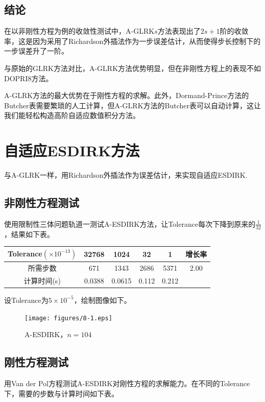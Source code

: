 \documentclass[lang=cn,10pt,bibend=bibtex]{elegantbook}
\begin{document}
\subsection{结论}

在以非刚性方程为例的收敛性测试中，A-GLRK$s$方法表现出了$2s+1$阶的收敛率，这是因为采用了Richardson外插法作为一步误差估计，从而使得步长控制下的一步误差升了一阶。

与原始的GLRK方法对比，A-GLRK方法优势明显，但在非刚性方程上的表现不如DOPRI8方法。

A-GLRK方法的最大优势在于刚性方程的求解。此外，Dormand-Prince方法的Butcher表需要繁琐的人工计算，但A-GLRK方法的Butcher表可以自动计算，这让我们能轻松构造高阶自适应数值积分方法。

\section{自适应ESDIRK方法}

与A-GLRK一样，用Richardson外插法作为误差估计，来实现自适应ESDIRK.

\subsection{非刚性方程测试}

使用限制性三体问题轨道一测试A-ESDIRK方法，让Tolerance每次下降到原来的$\frac{1}{32}$，结果如下表。

\begin{table}[H]
  \centering
  \begin{tabular}{c|cccc|c}
    Tolerance$(\times 10^{-13})$ & 32768 & 1024 & 32 & 1 & 增长率 \\ \hline
    所需步数 & 671 & 1343  & 2686 & 5371 & 2.00   \\
    计算时间(s) & 0.0388 & 0.0615  & 0.112  & 0.212 & 
  \end{tabular}
\end{table}

设Tolerance为$5\times 10^{-5}$，绘制图像如下。

\begin{figure}[H]
  \centering
  \texttt{[image: figures/8-1.eps]}
  \caption*{A-ESDIRK，$n=104$}
\end{figure}

\subsection{刚性方程测试}

用Van der Pol方程测试A-ESDIRK对刚性方程的求解能力。在不同的Tolerance下，需要的步数与计算时间如下表。
\end{document}
